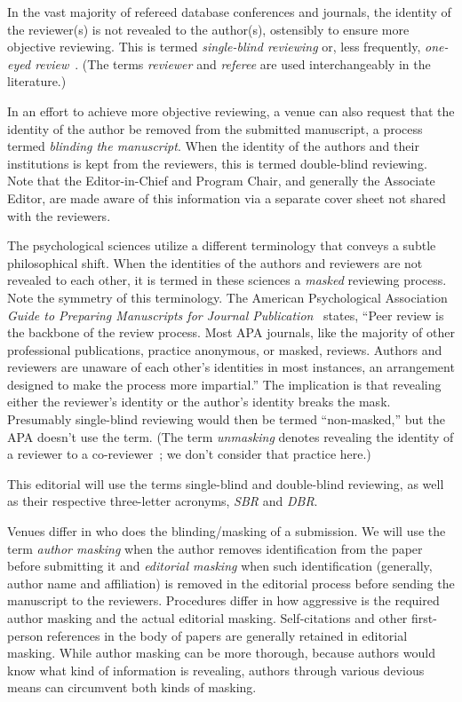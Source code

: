 \documentclass[acmtods,acmnow]{acmtrans2m}
\begin{document}
In the vast majority of refereed database conferences and journals, the
identity of the reviewer(s) is not revealed to the author(s), ostensibly to
ensure more objective reviewing. This is termed {\em single-blind reviewing}
or, less frequently, {\em one-eyed review}~\cite{rosenblatt80}. (The terms
{\em reviewer} and {\em referee} are used interchangeably in the literature.)

In an effort to achieve more objective reviewing, a venue can also request
that the identity of the author be removed from the submitted manuscript, a
process termed {\em blinding the manuscript}. When the identity of the
authors and their institutions is kept from the reviewers, this is termed
{double-blind reviewing}. Note that the Editor-in-Chief and Program Chair,
and generally the Associate Editor, are made aware of this information via a
separate cover sheet not shared with the reviewers.

The psychological sciences utilize a different terminology that conveys a
subtle philosophical shift. When the identities of the authors and reviewers
are not revealed to each other, it is termed in these sciences a {\em
masked} reviewing process. Note the symmetry of this terminology. The
American Psychological Association {\em Guide to Preparing Manuscripts for
Journal Publication}~\cite{APAGuide} states, ``Peer review is the backbone
of the review process. Most APA journals, like the majority of other
professional publications, practice anonymous, or masked, reviews. Authors
and reviewers are unaware of each other's identities in most instances, an
arrangement designed to make the process more impartial.'' The implication
is that revealing either the reviewer's identity or the author's identity
breaks the mask. Presumably single-blind reviewing would then be termed
``non-masked,'' but the APA doesn't use the term. (The term
{\em unmasking} denotes revealing the identity of a reviewer to a
co-reviewer~\cite{vanRooyen99}; we don't consider that practice here.)

This editorial will use the terms single-blind and double-blind
reviewing, as well as their respective three-letter acronyms, {\em SBR} and
{\em DBR}.

Venues differ in who does the blinding/masking of a submission. We will use
the term {\em author masking} when the author removes identification from the
paper before submitting it and {\em editorial masking} when such
identification (generally, author name and affiliation) is removed in the
editorial process before sending the manuscript to the reviewers. Procedures
differ in how aggressive is the required author masking and the actual
editorial masking. Self-citations and other first-person references in the
body of papers are generally retained in editorial masking.  While author
masking can be more thorough, because authors would know what kind of
information is revealing, authors through various devious means can
circumvent both kinds of masking.
\end{document}
